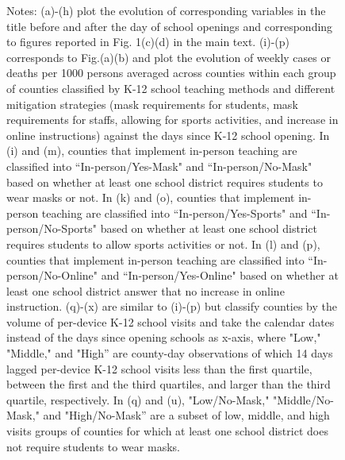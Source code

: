 \documentclass[9pt,twoside,lineno]{pnas-new}
\theoremstyle{definition}
\begin{document}
\begin{figure}[ht]
{\begin{flushleft}
Notes:  (a)-(h)  plot the evolution of corresponding variables in the title before and after the day of school openings and corresponding to figures reported in Fig. 1(c)(d) in the main text. (i)-(p) corresponds to Fig.(a)(b) and  plot the evolution of weekly cases or deaths per 1000 persons averaged across counties within each group of counties classified by K-12 school teaching methods and different mitigation strategies (mask requirements for students, mask requirements for staffs, allowing for sports activities, and increase in online instructions) against the days since K-12 school opening. In (i) and (m), counties that implement in-person teaching  are classified into ``In-person/Yes-Mask" and  ``In-person/No-Mask" based on whether at least one school district requires students to wear masks or not. In (k) and (o),  counties that implement in-person teaching are classified into ``In-person/Yes-Sports" and  ``In-person/No-Sports" based on whether at least one school district requires students to allow sports activities or not. In (l) and (p),  counties that implement in-person teaching   are classified into ``In-person/No-Online" and  ``In-person/Yes-Online" based on whether at least one school district answer that no increase in online instruction. (q)-(x) are similar to (i)-(p) but classify counties by the volume of per-device K-12 school visits and take the calendar dates instead of the days since opening schools as x-axis, where  "Low,"   "Middle," and "High'' are county-day observations of which 14 days lagged per-device K-12 school visits less than the first quartile, between the first and the third quartiles, and larger than the third quartile, respectively. In (q) and (u),   "Low/No-Mask,"   "Middle/No-Mask," and "High/No-Mask'' are a subset of low, middle, and high visits groups of counties for which at least one school district does not require students to wear masks. 
 \end{flushleft}    }
\end{figure}
\end{document}

